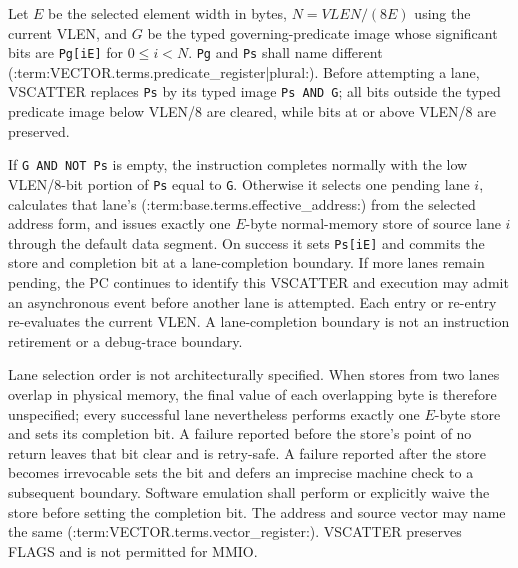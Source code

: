 Let $E$ be the selected element width in bytes, $N=VLEN/(8E)$ using the
current VLEN, and $G$ be
the typed governing-predicate image whose significant bits are
\texttt{Pg[iE]} for $0\leq i<N$.  \texttt{Pg} and \texttt{Ps} shall name
different (:term:VECTOR.terms.predicate_register|plural:).  Before attempting a lane, VSCATTER replaces
\texttt{Ps} by its typed image \texttt{Ps AND G}; all bits outside the typed
predicate image below VLEN/8 are cleared, while bits at or above VLEN/8 are
preserved.

If \texttt{G AND NOT Ps} is empty, the instruction completes normally with
the low VLEN/8-bit portion of \texttt{Ps} equal to \texttt{G}. Otherwise it selects one pending lane $i$, calculates that
lane's (:term:base.terms.effective_address:) from the selected address form, and issues exactly one $E$-byte
normal-memory store of source lane $i$ through the default data segment.  On
success it sets \texttt{Ps[iE]} and commits the store and completion bit at a
lane-completion boundary.  If more lanes remain pending, the PC continues to
identify this VSCATTER and execution may admit an asynchronous event before
another lane is attempted. Each entry or re-entry re-evaluates the current
VLEN. A lane-completion boundary is not an instruction
retirement or a debug-trace boundary.

Lane selection order is not architecturally specified.  When stores from two
lanes overlap in physical memory, the final value of each overlapping byte is
therefore unspecified; every successful lane nevertheless performs exactly
one $E$-byte store and sets its completion bit.  A failure reported before the
store's point of no return leaves that bit clear and is retry-safe.  A failure
reported after the store becomes irrevocable sets the bit and defers an
imprecise machine check to a subsequent boundary.  Software emulation shall perform or explicitly waive the
store before setting the completion bit.  The address and source vector may
name the same (:term:VECTOR.terms.vector_register:).  VSCATTER preserves FLAGS and is not permitted for
MMIO.
